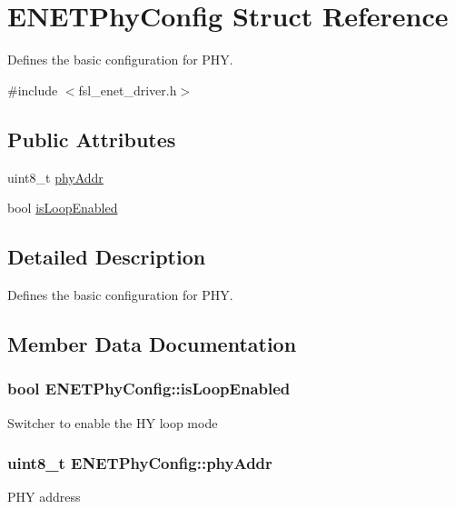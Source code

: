 \hypertarget{structENETPhyConfig}{}\section{E\+N\+E\+T\+Phy\+Config Struct Reference}
\label{structENETPhyConfig}


Defines the basic configuration for P\+HY.  




{\ttfamily \#include $<$fsl\+\_\+enet\+\_\+driver.\+h$>$}

\subsection*{Public Attributes}
\begin{DoxyCompactItemize}
\item 
uint8\+\_\+t \hyperlink{structENETPhyConfig_a6839305c31b5832862445dbfa9986098}{phy\+Addr}
\item 
bool \hyperlink{structENETPhyConfig_a56d797a44927111cd398608e68f6d5a2}{is\+Loop\+Enabled}
\end{DoxyCompactItemize}


\subsection{Detailed Description}
Defines the basic configuration for P\+HY. 

\subsection{Member Data Documentation}
\subsubsection[{\texorpdfstring{is\+Loop\+Enabled}{isLoopEnabled}}]{\setlength{\rightskip}{0pt plus 5cm}bool E\+N\+E\+T\+Phy\+Config\+::is\+Loop\+Enabled}\hypertarget{structENETPhyConfig_a56d797a44927111cd398608e68f6d5a2}{}\label{structENETPhyConfig_a56d797a44927111cd398608e68f6d5a2}
Switcher to enable the HY loop mode 
\subsubsection[{\texorpdfstring{phy\+Addr}{phyAddr}}]{\setlength{\rightskip}{0pt plus 5cm}uint8\+\_\+t E\+N\+E\+T\+Phy\+Config\+::phy\+Addr}\hypertarget{structENETPhyConfig_a6839305c31b5832862445dbfa9986098}{}\label{structENETPhyConfig_a6839305c31b5832862445dbfa9986098}
P\+HY address 

